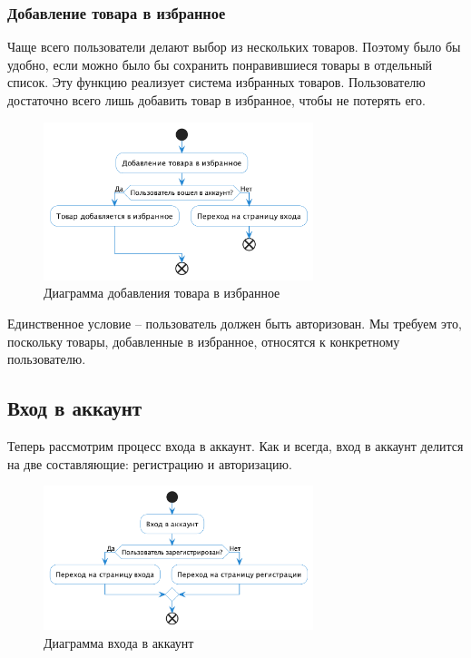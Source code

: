 \documentclass[a4paper,14pt]{extarticle}
\begin{document}
\subsubsection*{Добавление товара в избранное}

Чаще всего пользователи делают выбор из нескольких товаров. Поэтому было бы удобно, если можно было бы сохранить понравившиеся товары в отдельный список. Эту функцию реализует система избранных товаров. Пользователю достаточно всего лишь добавить товар в избранное, чтобы не потерять его.

\begin{figure}[H]
    \centering
    \includegraphics[width=0.7\textwidth]{images/add_to_favourites.png}
    \caption{Диаграмма добавления товара в избранное}
\end{figure}

Единственное условие -- пользователь должен быть авторизован. Мы требуем это, поскольку товары, добавленные в избранное, относятся к конкретному пользователю.

\subsection{Вход в аккаунт}

Теперь рассмотрим процесс входа в аккаунт. Как и всегда, вход в аккаунт делится на две составляющие: регистрацию и авторизацию.

\begin{figure}[H]
    \centering
    \includegraphics[width=0.7\textwidth]{images/login.png}
    \caption{Диаграмма входа в аккаунт}
\end{figure}
\end{document}
